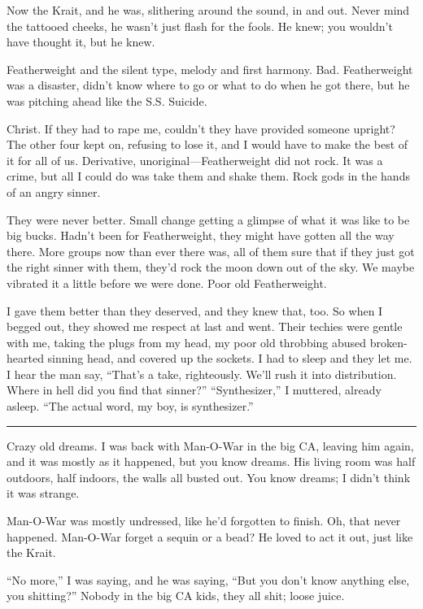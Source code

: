Now the Krait, and he was, slithering around the sound, in and out. Never mind the tattooed cheeks, he wasn't just flash for the fools. He knew; you wouldn't have thought it, but he knew.

Featherweight and the silent type, melody and first harmony. Bad. Featherweight was a disaster, didn't know where to go or what to do when he got there, but he was pitching ahead like the S.S. Suicide.

Christ. If they had to rape me, couldn't they have provided someone upright? The other four kept on, refusing to lose it, and I would have to make the best of it for all of us. Derivative, unoriginal—Featherweight did not rock. It was a crime, but all I could do was take them and shake them. Rock gods in the hands of an angry sinner.

They were never better. Small change getting a glimpse of what it was like to be big bucks. Hadn't been for Featherweight, they might have gotten all the way there. More groups now than ever there was, all of them sure that if they just got the right sinner with them, they'd rock the moon down out of the sky.
We maybe vibrated it a little before we were done. Poor old Featherweight.

I gave them better than they deserved, and they knew that, too. So when I begged out, they showed me respect at last and went. Their techies were gentle with me, taking the plugs from my head, my poor old throbbing abused broken-hearted sinning head, and covered up the sockets. I had to sleep and they let me. I hear the man say, ``That's a take, righteously. We'll rush it into distribution. Where in hell did you find that sinner?''
``Synthesizer,'' I muttered, already asleep. ``The actual word, my boy, is synthesizer.''

\fancybreak{* * *}

Crazy old dreams. I was back with Man-O-War in the big CA, leaving him again, and it was mostly as it happened, but you know dreams. His living room was half outdoors, half indoors, the walls all busted out. You know dreams; I didn't think it was strange.

Man-O-War was mostly undressed, like he'd forgotten to finish. Oh, that never happened. Man-O-War forget a sequin or a bead? He loved to act it out, just like the Krait.

``No more,'' I was saying, and he was saying, ``But you don't know anything else, you shitting?'' Nobody in the big CA kids, they all shit; loose juice.

